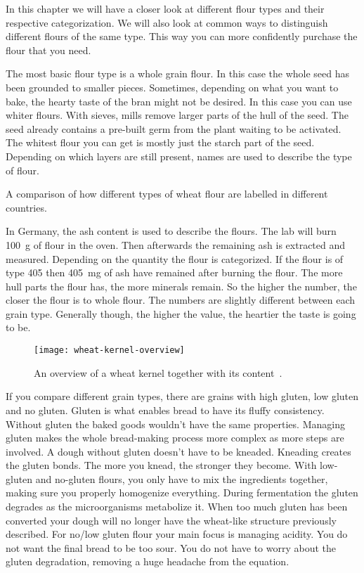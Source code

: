 In this chapter we will have a closer look at different flour types
and their respective categorization. We will also look at common
ways to distinguish different flours of the same type. This way you can more confidently
purchase the flour that you need.

The most basic flour type is a whole grain flour. In this case the whole seed has
been grounded to smaller pieces. Sometimes, depending on what you want to bake,
the hearty taste of the bran might not be desired. In this case you can use
whiter flours. With sieves, mills remove larger parts of the hull of the seed.
The seed already contains a pre-built germ from the plant waiting to be
activated. The whitest flour you can get is mostly just the starch part of the seed.
Depending on which layers are still present, names are used to describe the
type of flour.

\begin{table}[!htb]
    \begin{center}
        
        \caption{A comparison of how different types of wheat flour are
        labelled in different countries.}%
        \label{tab:flour-types-comparison}
    \end{center}
\end{table}

In Germany, the ash content is used to describe the flours. The lab will burn
\qty{100}{\gram} of flour in the oven. Then afterwards the remaining ash is extracted
and measured. Depending on the quantity the flour is categorized. If the flour
is of type 405 then \qty{405}{\mg} of ash have remained after burning the
flour. The more hull parts the flour has, the more minerals remain. So the
higher the number, the closer the flour is to whole flour. The numbers are
slightly different between each grain type. Generally though, the higher the
value, the heartier the taste is going to be.

\begin{figure}[htb!]
  \texttt{[image: wheat-kernel-overview]}
  \caption{An overview of a wheat kernel together with its
  content~\cite{wheat+kernel}.}%
  \label{fig:wheat-kernel-overview}
\end{figure}

If you compare different grain types, there are grains with high gluten, low gluten
and no gluten. Gluten is what enables bread to have its fluffy consistency.
Without gluten the baked goods wouldn't have the same properties. Managing
gluten makes the whole bread-making process more complex as more steps are involved.
A dough without gluten doesn't have to be kneaded. Kneading creates
the gluten bonds. The more you knead, the stronger they become. With low-gluten
and no-gluten flours, you only have to mix the ingredients together, making
sure you properly homogenize everything. During fermentation
the gluten degrades as the microorganisms metabolize it. When too much gluten
has been converted your dough will no longer have the wheat-like structure previously
described. For no/low gluten flour your main focus is managing acidity. You do not
want the final bread to be too sour. You do not have to worry about the gluten
degradation, removing a huge headache from the equation.

